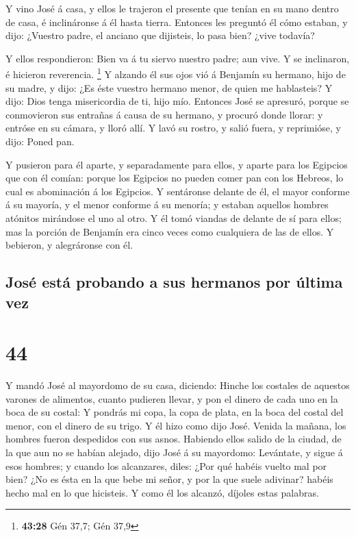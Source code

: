  Y vino José á casa, y ellos le trajeron el presente que
tenían en su mano dentro de casa, é inclináronse á él hasta tierra.
 Entonces les preguntó él cómo estaban, y dijo: ¿Vuestro
padre, el anciano que dijisteis, lo pasa bien? ¿vive todavía?

 Y ellos respondieron: Bien va á tu siervo nuestro padre;
aun vive. Y se inclinaron, é hicieron reverencia. \footnote{\textbf{43:28}
  Gén 37,7; Gén 37,9}  Y alzando él sus ojos vió á Benjamín
su hermano, hijo de su madre, y dijo: ¿Es éste vuestro hermano menor, de
quien me hablasteis? Y dijo: Dios tenga misericordia de ti, hijo mío.
 Entonces José se apresuró, porque se conmovieron sus
entrañas á causa de su hermano, y procuró donde llorar: y entróse en su
cámara, y lloró allí.  Y lavó su rostro, y salió fuera, y
reprimióse, y dijo: Poned pan.

 Y pusieron para él aparte, y separadamente para ellos, y
aparte para los Egipcios que con él comían: porque los Egipcios no
pueden comer pan con los Hebreos, lo cual es abominación á los Egipcios.
 Y sentáronse delante de él, el mayor conforme á su
mayoría, y el menor conforme á su menoría; y estaban aquellos hombres
atónitos mirándose el uno al otro.  Y él tomó viandas de
delante de sí para ellos; mas la porción de Benjamín era cinco veces
como cualquiera de las de ellos. Y bebieron, y alegráronse con él.

\hypertarget{josuxe9-estuxe1-probando-a-sus-hermanos-por-uxfaltima-vez}{%
\subsection{José está probando a sus hermanos por última
vez}\label{josuxe9-estuxe1-probando-a-sus-hermanos-por-uxfaltima-vez}}

\hypertarget{section-43}{%
\section{44}\label{section-43}}

 Y mandó José al mayordomo de su casa, diciendo: Hinche los
costales de aquestos varones de alimentos, cuanto pudieren llevar, y pon
el dinero de cada uno en la boca de su costal:  Y pondrás mi
copa, la copa de plata, en la boca del costal del menor, con el dinero
de su trigo. Y él hizo como dijo José.  Venida la mañana,
los hombres fueron despedidos con sus asnos.  Habiendo ellos
salido de la ciudad, de la que aun no se habían alejado, dijo José á su
mayordomo: Levántate, y sigue á esos hombres; y cuando los alcanzares,
diles: ¿Por qué habéis vuelto mal por bien?  ¿No es ésta en
la que bebe mi señor, y por la que suele adivinar? habéis hecho mal en
lo que hicisteis.  Y como él los alcanzó, díjoles estas
palabras.

